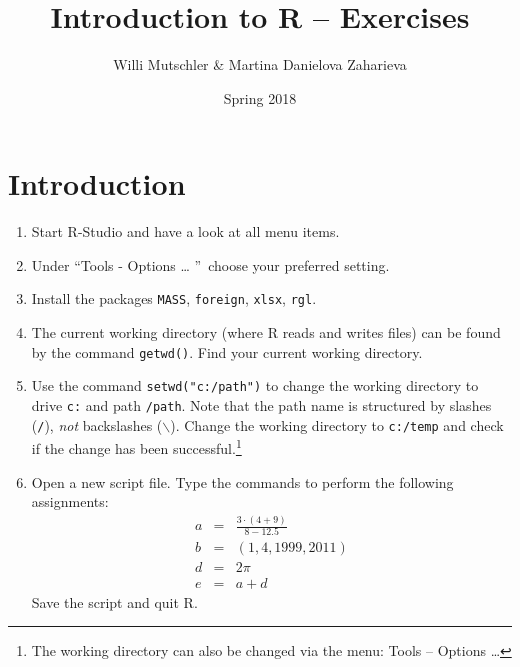 \documentclass{article}
\begin{document}
\title{Introduction to R -- Exercises}
\author{Willi Mutschler \& Martina Danielova Zaharieva}
\date{Spring 2018}
\maketitle
\tableofcontents
\newpage
\setcounter{page}{1}
\section{Introduction}

\begin{enumerate}
\item Start R-Studio and have a look at all menu items.


\item Under \textquotedblleft Tools - Options \ldots
\textquotedblright\ choose your preferred
setting.

\item Install the packages \texttt{MASS}, \texttt{foreign}, \texttt{xlsx}, 
\texttt{rgl}.

\item The current working directory (where R reads and writes files) can be
found by the command \texttt{getwd()}. Find your current working directory.

\item Use the  command \texttt{setwd("{}c:/path")} to change the working
directory to drive \texttt{c:} and path \texttt{/path}. Note that the path
name is structured by slashes (\texttt{/}), \emph{not} backslashes ($\backslash$). Change the working directory to \texttt{c:/temp}
and check if the change has been successful.\footnote{%
The working directory can also be changed via the menu: Tools -- Options \ldots}


\item Open a new script file. Type the commands to perform the following
assignments:%
\begin{eqnarray*}
a &=&\frac{3\cdot (4+9)}{8-12.5} \\
b &=&\left( 1,4,1999,2011\right) \\
d &=&2\pi \\
e &=&a+d
\end{eqnarray*}%
Save the script and quit R.


\end{enumerate}
\end{document}
